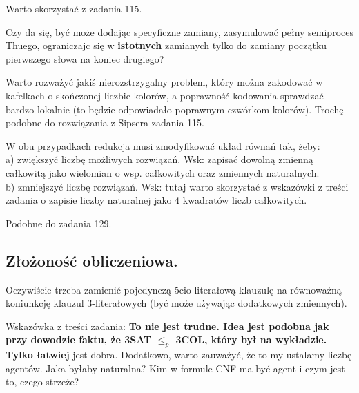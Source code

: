 \documentclass[a4paper,11pt]{article}
\newenvironment{zadanie}[1]
  {\renewcommand\theinnercustomthm{#1}\innercustomthm}
  {\endinnercustomthm}
\begin{document}
\begin{zadanie}{116}
Warto skorzystać z zadania 115.
\end{zadanie}

\begin{zadanie}{118}
Czy da się, być może dodając specyficzne zamiany, zasymulować pełny semiproces Thuego, ograniczajc się w \textbf{istotnych} 
zamianych tylko do zamiany początku pierwszego słowa na koniec drugiego?
\end{zadanie}

\begin{zadanie}{120}
 Warto rozważyć jakiś nierozstrzygalny problem, który można zakodować w kafelkach o skończonej liczbie kolorów, a poprawność
 kodowania sprawdzać bardzo lokalnie (to będzie odpowiadało poprawnym czwórkom kolorów). Trochę podobne do rozwiązania 
 z Sipsera zadania 115.
\end{zadanie}

\begin{zadanie}{121}
 W obu przypadkach redukcja musi zmodyfikować układ równań tak, żeby:\\
 a) zwiększyć liczbę możliwych rozwiązań. Wsk: zapisać dowolną zmienną całkowitą jako wielomian o wsp. całkowitych oraz 
 zmiennych naturalnych. \\
 b) zmniejszyć liczbę rozwiązań. Wsk: tutaj warto skorzystać z wskazówki z treści zadania o zapisie liczby naturalnej 
 jako 4 kwadratów liczb całkowitych.
\end{zadanie}

\begin{zadanie}{122}
 Podobne do zadania 129.
\end{zadanie}


\subsection{Złożoność obliczeniowa.}

\begin{zadanie}{143}
Oczywiście trzeba zamienić pojedynczą 5cio literałową klauzulę na równoważną koniunkcję klauzul 3-literałowych 
(być może używając dodatkowych zmiennych).
\end{zadanie}

\begin{zadanie}{144}
Wskazówka z treści zadania: \textbf{To nie jest trudne. Idea jest podobna jak przy dowodzie faktu, że 3SAT $\leqslant_p$ 3COL, który był na wykładzie. Tylko łatwiej} jest dobra. Dodatkowo, warto zauważyć, że to my ustalamy liczbę agentów. Jaka byłaby 
naturalna? Kim w formule CNF ma być agent i czym jest to, czego strzeże?
\end{zadanie}
\end{document}
